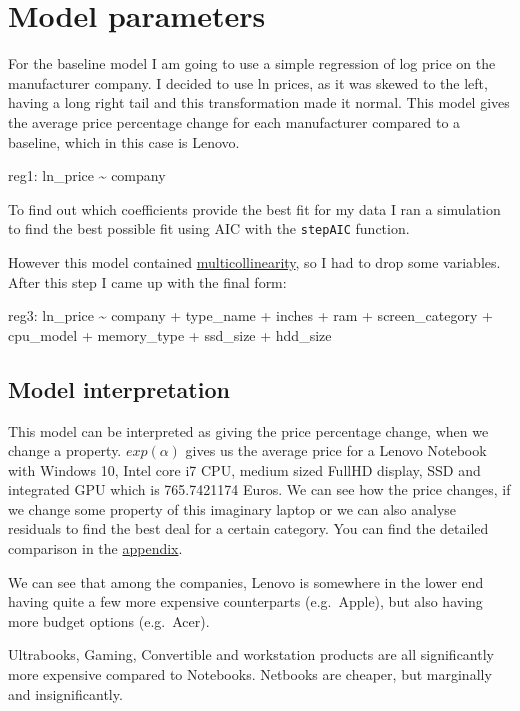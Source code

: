 \documentclass[
]{article}
\begin{document}
\hypertarget{model-parameters}{%
\section{Model parameters}\label{model-parameters}}

For the baseline model I am going to use a simple regression of log
price on the manufacturer company. I decided to use ln prices, as it was
skewed to the left, having a long right tail and this transformation
made it normal. This model gives the average price percentage change for
each manufacturer compared to a baseline, which in this case is Lenovo.

reg1: ln\_price \textasciitilde{} company

To find out which coefficients provide the best fit for my data I ran a
simulation to find the best possible fit using AIC with the
\texttt{stepAIC} function.

However this model contained
\protect\hyperlink{multicollinearity}{multicollinearity}, so I had to
drop some variables. After this step I came up with the final form:

reg3: ln\_price \textasciitilde{} company + type\_name + inches + ram +
screen\_category + cpu\_model + memory\_type + ssd\_size + hdd\_size

\hypertarget{model-interpretation}{%
\subsection{Model interpretation}\label{model-interpretation}}

This model can be interpreted as giving the price percentage change,
when we change a property. \(exp(\alpha)\) gives us the average price
for a Lenovo Notebook with Windows 10, Intel core i7 CPU, medium sized
FullHD display, SSD and integrated GPU which is 765.7421174 Euros. We
can see how the price changes, if we change some property of this
imaginary laptop or we can also analyse residuals to find the best deal
for a certain category. You can find the detailed comparison in the
\protect\hyperlink{detailed-model-comparison}{appendix}.

We can see that among the companies, Lenovo is somewhere in the lower
end having quite a few more expensive counterparts (e.g.~Apple), but
also having more budget options (e.g.~Acer).

Ultrabooks, Gaming, Convertible and workstation products are all
significantly more expensive compared to Notebooks. Netbooks are
cheaper, but marginally and insignificantly.
\end{document}

